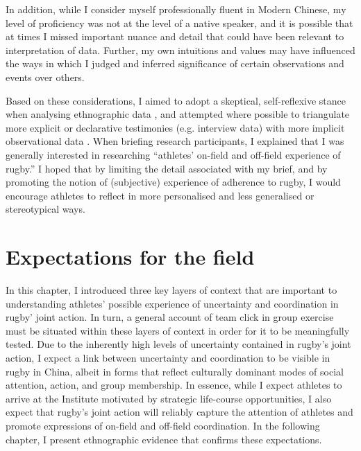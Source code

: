 \begin{CJK}{UTF8}{gbsn}
 In addition, while I consider myself professionally fluent in Modern Chinese, my level of proficiency was not at the level of a native speaker, and it is possible that at times I missed important nuance and detail that could have been relevant to interpretation of data. Further, my own intuitions and values may have influenced the ways in which I judged and inferred significance of certain observations and  events over others.

 Based on these considerations, I aimed to adopt a skeptical, self-reflexive stance when analysing ethnographic data \citep{Lichterman2017}, and attempted where possible to triangulate more explicit or declarative testimonies (e.g. interview data) with more implicit observational data \citep[see, for example:][]{Duffy1987}.
 When briefing research participants, I explained that I was generally interested in researching ``athletes' on-field and off-field experience of rugby.'' I hoped that by limiting the detail associated with my brief, and by promoting the notion of (subjective) experience of adherence to rugby, I would encourage athletes to reflect in more personalised and less generalised or stereotypical ways.









\section{Expectations for the field}

In this chapter, I introduced three key layers of context that are important to understanding athletes' possible experience of uncertainty and coordination in rugby' joint action.  In turn, a general account of team click in group exercise must be situated within these layers of context in order for it to be meaningfully tested.  Due to the inherently high levels of uncertainty contained in rugby's joint action, I expect a link between uncertainty and coordination to be visible in rugby in China, albeit in forms that reflect culturally dominant modes of social attention, action, and group membership.  In essence, while I expect athletes to arrive at the Institute motivated by strategic life-course opportunities, I also expect that rugby's joint action will reliably capture the attention of athletes and promote expressions of on-field and off-field coordination.  In the following chapter, I present ethnographic evidence that confirms these expectations.















                                                          \end{CJK}
